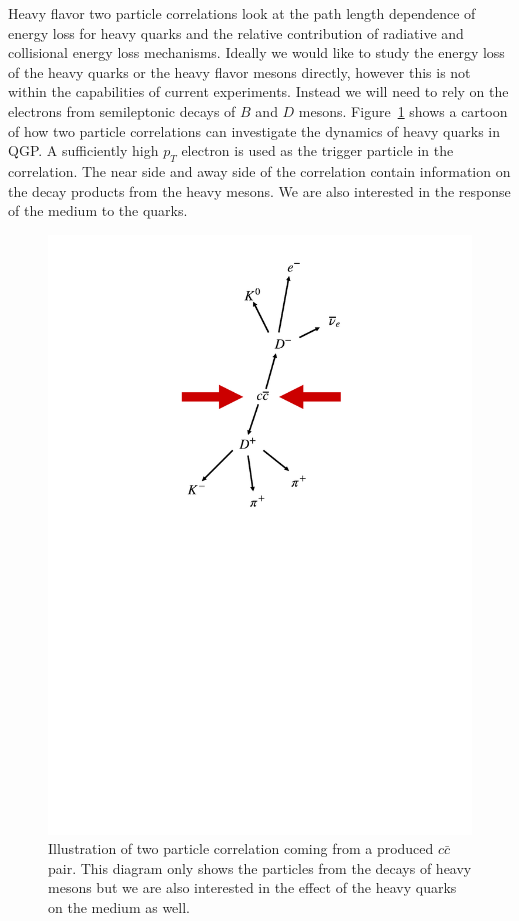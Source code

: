 Heavy flavor two particle correlations look at the path length dependence of energy loss for heavy quarks and the relative contribution of radiative and collisional energy loss mechanisms. Ideally we would like to study the energy loss of the heavy quarks or the heavy flavor mesons directly, however this is not within the capabilities of current experiments. Instead we will need to rely on the electrons from semileptonic decays of $B$ and $D$ mesons. Figure~\ref{fig:two_part} shows a cartoon of how two particle correlations can investigate the dynamics of heavy quarks in QGP. A sufficiently high $p_T$ electron is used as the trigger particle in the correlation. The near side and away side of the correlation contain information on the decay products from the heavy mesons. We are also interested in the response of the medium to the quarks.

\begin{figure}[htbp]
\begin{center}
\includegraphics[scale=1.3]{Plots/Intro/ccbar.pdf}
\end{center}
\caption[Two Particle Correlation from $c\bar{c}$]{Illustration of two particle correlation coming from a produced $c\bar{c}$ pair. This diagram only shows the particles from the decays of heavy mesons but we are also interested in the effect of the heavy quarks on the medium as well.}
\label{fig:two_part}
\end{figure}

